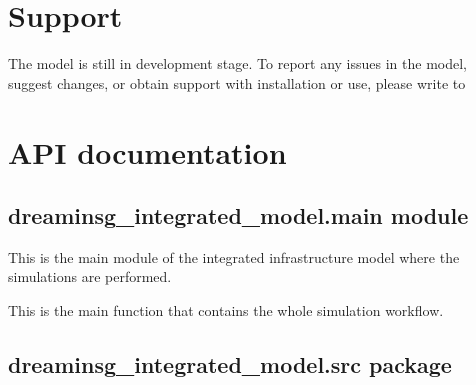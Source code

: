 \documentclass[letterpaper,10pt,english]{sphinxmanual}
\begin{document}
\chapter{Support}
\label{\detokenize{support:support}}\label{\detokenize{support::doc}}
\sphinxAtStartPar
The model is still in development stage. To report any issues in the model,
suggest changes, or obtain support with installation or use, please write to


\chapter{API documentation}
\label{\detokenize{apidoc:api-documentation}}\label{\detokenize{apidoc::doc}}

\section{dreaminsg\_integrated\_model.main module}
\label{\detokenize{apidoc:module-dreaminsg_integrated_model.main}}\label{\detokenize{apidoc:dreaminsg-integrated-model-main-module}}
\sphinxAtStartPar
This is the main module of the integrated infrastructure model where the simulations are performed.

\begin{fulllineitems}
\label{\detokenize{apidoc:dreaminsg_integrated_model.main.main}}
\sphinxAtStartPar
This is the main function that contains the whole simulation workflow.

\end{fulllineitems}



\section{dreaminsg\_integrated\_model.src package}
\label{\detokenize{apidoc:dreaminsg-integrated-model-src-package}}
\end{document}
